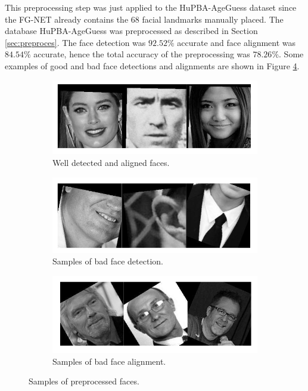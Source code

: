 This preprocessing step was just applied to the HuPBA-AgeGuess dataset since the FG-NET already contains the 68 facial landmarks manually placed. The database HuPBA-AgeGuess was preprocessed as described in Section \ref{sec:preproces}. The face detection was $92.52\%$ accurate and face alignment was $84.54\%$ accurate, hence the total accuracy of the preprocessing was $78.26\%$. Some examples of good and bad face detections and alignments are shown in Figure \ref{fig:sampPP}.

\begin{figure}[!h]
	\centering
	\begin{subfigure}[b]{\textwidth}
		\includegraphics[width=\textwidth]{figures/good_pp}
		\caption{Well detected and aligned faces.}
		\label{fig:goodPP}
	\end{subfigure}%
	
	\begin{subfigure}[b]{\textwidth}
		\includegraphics[width=\textwidth]{figures/bad_detection}
		\caption{Samples of bad face detection.}
		\label{fig:badDet}
	\end{subfigure}
	
	\begin{subfigure}[b]{\textwidth}
		\includegraphics[width=\textwidth]{figures/bad_alignment}
		\caption{Samples of bad face alignment.}
		\label{fig:badAl}
	\end{subfigure}
	\caption{Samples of preprocessed faces.}\label{fig:sampPP}
\end{figure}

